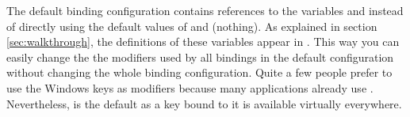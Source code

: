 The default binding configuration contains references to the variables
 and  instead of directly using the default
values of  and  (nothing). As explained in
section \ref{sec:walkthrough}, the definitions of these variables
appear in . This way you can easily change the the
modifiers used by all bindings in the default configuration without 
changing the whole binding configuration. Quite a few people prefer 
to use the Windows keys as modifiers because many applications already
use . Nevertheless,  is the default as a key bound 
to it is available virtually everywhere.

